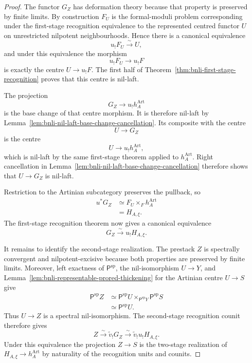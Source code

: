 \begin{proof}
The functor $G_Z$ has deformation theory because that property is preserved
by finite limits.  By construction $F_U$ is the formal-moduli problem
corresponding under the first-stage recognition equivalence to the represented
centred functor $U$ on unrestricted nilpotent neighbourhoods.  Hence there is
a canonical equivalence
\[
    u_!F_U\xrightarrow{\sim}U,
\]
and under this equivalence the morphism
\[
    u_!F_U\longrightarrow u_!F
\]
is exactly the centre $U\to u_!F$.  The first half of
Theorem~\ref{thm:bnli-first-stage-recognition} proves that this centre is
nil-laft.

The projection
\[
    G_Z\longrightarrow u_!h_A^{\mathrm{Art}}
\]
is the base change of that centre morphism.  It is therefore nil-laft by
Lemma~\ref{lem:bnli-nil-laft-base-change-cancellation}.  Its composite with
the centre
\[
    U\longrightarrow G_Z
\]
is the centre
\[
    U\longrightarrow u_!h_A^{\mathrm{Art}},
\]
which is nil-laft by the same first-stage theorem applied to
$h_A^{\mathrm{Art}}$.  Right cancellation in
Lemma~\ref{lem:bnli-nil-laft-base-change-cancellation} therefore shows that
$U\to G_Z$ is nil-laft.

Restriction to the Artinian subcategory preserves the pullback, so
\[
\begin{aligned}
    u^*G_Z
    &\simeq
    F_U\times_Fh_A^{\mathrm{Art}}\\
    &=H_{A,\xi}.
\end{aligned}
\]
The first-stage recognition theorem now gives a canonical equivalence
\[
\boxed{
    G_Z\xrightarrow{\sim}u_!H_{A,\xi}.}
\]

It remains to identify the second-stage realization.  The prestack $Z$ is
spectrally convergent and nilpotent-excisive because both properties are
preserved by finite limits.  Moreover, left exactness of
$\mathsf P^{\mathrm{sp}}$, the nil-isomorphism $U\to Y$, and
Lemma~\ref{lem:bnli-representable-prored-thickening} for the Artinian centre
$U\to S$ give
\[
\begin{aligned}
    \mathsf P^{\mathrm{sp}}Z
    &\simeq
    \mathsf P^{\mathrm{sp}}U
    \times_{\mathsf P^{\mathrm{sp}}Y}
    \mathsf P^{\mathrm{sp}}S\\
    &\simeq
    \mathsf P^{\mathrm{sp}}U.
\end{aligned}
\]
Thus $U\to Z$ is a spectral nil-isomorphism.  The second-stage recognition
counit therefore gives
\[
\boxed{
    Z
    \xrightarrow{\sim}
    \widetilde v_!G_Z
    \xrightarrow{\sim}
    \widetilde v_!u_!H_{A,\xi}.}
\]
Under this equivalence the projection $Z\to S$ is the two-stage realization
of $H_{A,\xi}\to h_A^{\mathrm{Art}}$ by naturality of the recognition units
and counits.


\end{proof}
